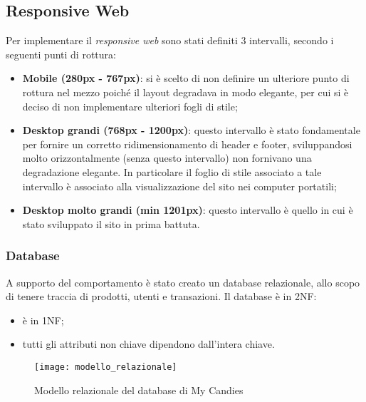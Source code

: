 \subsection{Responsive Web}
Per implementare il \textit{responsive web} sono stati definiti 3 intervalli, secondo i seguenti punti di rottura:
\begin{itemize}
    \item \textbf{Mobile (280px - 767px)}: si è scelto di non definire un ulteriore punto di rottura nel mezzo poiché  il layout degradava in modo elegante, per cui si è deciso di non implementare ulteriori fogli di stile;
    \item \textbf{Desktop grandi (768px - 1200px)}: questo intervallo è stato fondamentale per fornire un corretto ridimensionamento di header e footer, sviluppandosi molto orizzontalmente (senza questo intervallo) non fornivano una degradazione elegante. In particolare il foglio di stile associato a tale intervallo è associato alla visualizzazione del sito nei computer portatili;
    \item \textbf{Desktop molto grandi (min 1201px)}: questo intervallo è quello in cui è stato sviluppato il sito in prima battuta. 
\end{itemize}




\subsubsection{Database}
A supporto del comportamento è stato creato un database relazionale, allo scopo di tenere traccia di prodotti, utenti e transazioni. Il database è in 2NF:
\begin{itemize}
    \item è in 1NF;
    \item tutti gli attributi non chiave dipendono dall'intera chiave.
\end{itemize}
\begin{figure}[H]
\centering
\texttt{[image: modello\_relazionale]}
\caption{Modello relazionale del database di My Candies} 
\end{figure}
